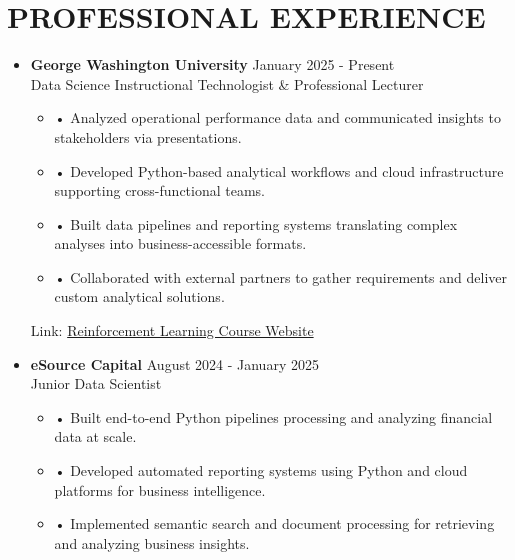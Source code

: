 \documentclass[a4paper,9pt]{extarticle}
\begin{document}

\section*{PROFESSIONAL EXPERIENCE}

\begin{itemize}[leftmargin=0.4cm, label={}]
    \item \textbf{George Washington University} \hfill January 2025 - Present \\
    Data Science Instructional Technologist \& Professional Lecturer
    \vspace{-0.1cm}
    \begin{itemize}[leftmargin=0.3cm, label={}]
\item \small{•} \normalsize{Analyzed operational performance data and communicated insights to stakeholders via presentations.}
    \item \small{•} \normalsize{Developed Python-based analytical workflows and cloud infrastructure supporting cross-functional teams.}
    \item \small{•} \normalsize{Built data pipelines and reporting systems translating complex analyses into business-accessible formats.}
    \item \small{•} \normalsize{Collaborated with external partners to gather requirements and deliver custom analytical solutions.}
    \end{itemize}
    Link: \href{https://twallett.com/courses/reinforcement-learning/}{Reinforcement Learning Course Website}
\end{itemize}

\noindent
\begin{itemize}[leftmargin=0.4cm, label={}]
    \item \textbf{eSource Capital} \hfill August 2024 - January 2025 \\
    Junior Data Scientist 
    \vspace{-0.1cm}
    \begin{itemize}[leftmargin=0.3cm, label={}]
\item \small{•} \normalsize{Built end-to-end Python pipelines processing and analyzing financial data at scale.}
    \item \small{•} \normalsize{Developed automated reporting systems using Python and cloud platforms for business intelligence.}
    \item \small{•} \normalsize{Implemented semantic search and document processing for retrieving and analyzing business insights.}
    \end{itemize}
\end{itemize}
\end{document}
